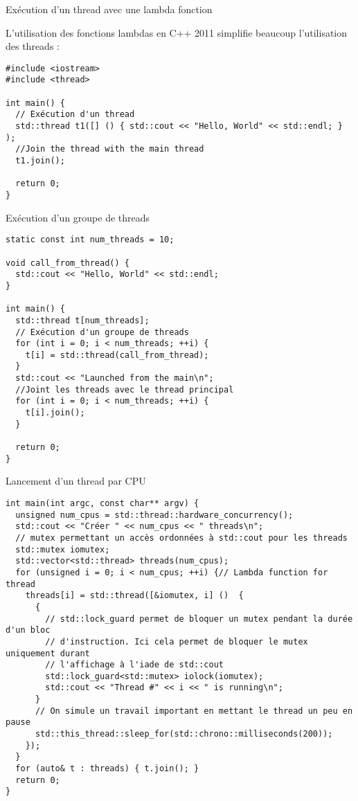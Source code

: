 \documentclass[handout,francais]{beamer}
\begin{document}
\begin{frame}[fragile]{Exécution d'un thread avec une lambda fonction}

L'utilisation des fonctions lambdas en C++ 2011 simplifie beaucoup
l'utilisation des threads :

\begin{lstlisting}
#include <iostream>
#include <thread>

int main() {
  // Exécution d'un thread
  std::thread t1([] () { std::cout << "Hello, World" << std::endl; } );
  //Join the thread with the main thread
  t1.join();

  return 0;
}
\end{lstlisting}

\end{frame}

\begin{frame}[fragile]{Exécution d'un groupe de threads}
 
 \begin{lstlisting}
static const int num_threads = 10;

void call_from_thread() {
  std::cout << "Hello, World" << std::endl;
}

int main() {
  std::thread t[num_threads];
  // Exécution d'un groupe de threads
  for (int i = 0; i < num_threads; ++i) {
    t[i] = std::thread(call_from_thread);
  }
  std::cout << "Launched from the main\n";
  //Joint les threads avec le thread principal
  for (int i = 0; i < num_threads; ++i) {
    t[i].join();
  }

  return 0;
}
\end{lstlisting}
\end{frame}

\begin{frame}[fragile]{Lancement d'un thread par CPU}
\begin{lstlisting}
int main(int argc, const char** argv) {
  unsigned num_cpus = std::thread::hardware_concurrency();
  std::cout << "Créer " << num_cpus << " threads\n";
  // mutex permettant un accès ordonnées à std::cout pour les threads
  std::mutex iomutex;
  std::vector<std::thread> threads(num_cpus);
  for (unsigned i = 0; i < num_cpus; ++i) {// Lambda function for thread
    threads[i] = std::thread([&iomutex, i] ()  {
      {
        // std::lock_guard permet de bloquer un mutex pendant la durée d'un bloc
        // d'instruction. Ici cela permet de bloquer le mutex uniquement durant
        // l'affichage à l'iade de std::cout
        std::lock_guard<std::mutex> iolock(iomutex);
        std::cout << "Thread #" << i << " is running\n";
      }
      // On simule un travail important en mettant le thread un peu en pause
      std::this_thread::sleep_for(std::chrono::milliseconds(200));
    });
  }
  for (auto& t : threads) { t.join(); }
  return 0;
} 
\end{lstlisting}
\end{frame}
\end{document}
